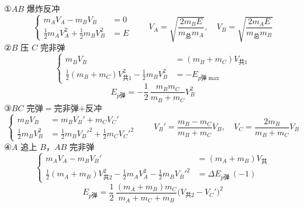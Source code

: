 \begin{problem}[{[2]}]
\begin{solution}
①$AB$ 爆炸反冲
\[
\left\{\begin{aligned}
m_AV_A-m_BV_B&=0 %
\\
\tfrac12m_AV_A^2+\tfrac12m_BV_B^2&=E
\end{aligned}\right.
\qquad
V_A=\sqrt{\frac{2m_BE}{m_{\text{总}}m_A}},\quad V_B=\sqrt{\frac{2m_AE}{m_{\text{总}}m_B}}
\]
②$B$ 压 $C$ 完非弹
\[
\left\{\begin{aligned}
m_BV_B&=(m_B+m_C)V_{\text{共}1}\\
\tfrac12(m_B+m_C)V_{\text{共}1}^2-\tfrac12m_BV_B^2&=-E_{p\text{弹}\max}
\end{aligned}\right.
\]
\[
E_{p\text{弹}}=-\frac12\,\frac{m_Bm_C}{m_B+m_C}V_B^2 %
\]
③$BC$ 完弹$=$完非弹$+$反冲
\[
\left\{\begin{aligned}
m_BV_B&=m_BV_B'+m_CV_C'\\
\tfrac12m_BV_B^2&=\tfrac12m_BV_B'^2+\tfrac12m_CV_C'^2
\end{aligned}\right.
\qquad
V_B'=\frac{m_B-m_C}{m_B+m_C}V_B,\quad V_C=\frac{2m_B}{m_B+m_C}V_B %
\]
④$A$ 追上 $B$，$AB$ 完非弹
\[
\left\{\begin{aligned}
m_AV_A-m_BV_B'&=(m_A+m_B)V_{\text{共}}\\
\tfrac12(m_A+m_B)V_{\text{共}2}^2-\tfrac12m_AV_A^2-\tfrac12m_BV_B'^2&=\Delta E_{p\text{弹}}\,(-1)
\end{aligned}\right.
\]
\[
E_{p\text{弹}}=\frac12\,\frac{(m_A+m_B)m_C}{m_A+m_C+m_B}\bigl(V_{\text{共}2}-V_C'\bigr)^2
\]
\end{solution}
\end{problem}
